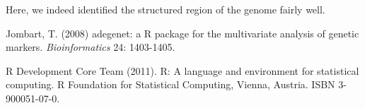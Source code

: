 \documentclass{article}
\begin{document}
\noindent Here, we indeed identified the structured region of the genome fairly well.







\begin{thebibliography}{9}

  Jombart, T. (2008) adegenet: a R package for the multivariate
  analysis of genetic markers. \textit{Bioinformatics} 24: 1403-1405.

  R Development Core Team (2011). R: A language and environment for
  statistical computing. R Foundation for Statistical Computing,
  Vienna, Austria. ISBN 3-900051-07-0.

\end{thebibliography}
\end{document}

